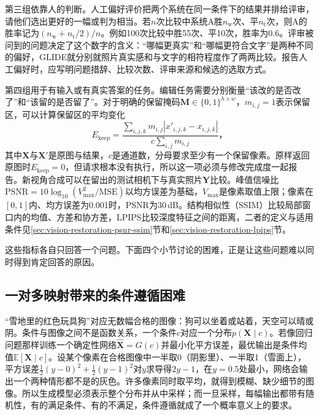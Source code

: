 第三组依靠人的判断。人工偏好评价把两个系统在同一条件下的结果并排给评审，请他们选出更好的一幅或判为相当。若$n$次比较中系统A胜$n_{\mathrm{w}}$次、平$n_{\mathrm{t}}$次，则A的胜率记为$(n_{\mathrm{w}}+n_{\mathrm{t}}/2)/n$。例如100次比较中胜55次、平10次，胜率为0.6。评审被问到的问题决定了这个数字的含义：“哪幅更真实”和“哪幅更符合文字”是两种不同的偏好，GLIDE就分别就照片真实感和与文字的相符程度作了两两比较。报告人工偏好时，应写明问题措辞、比较次数、评审来源和候选的选取方式。

第四组用于有输入或有真实答案的任务。编辑任务需要分别衡量“该改的是否改了”和“该留的是否留了”。对于明确的保留掩码$\bm{M}\in\{0,1\}^{h\times w}$，$m_{i,j}=1$表示保留区，可以计算保留区的平均变化
\begin{equation}
 E_{\mathrm{keep}}=
 \frac{\sum_{i,j,k}m_{i,j}
       |x'_{i,j,k}-x_{i,j,k}|}
 {c\sum_{i,j}m_{i,j}}\text{，}
 \label{eq:vision-edit-preservation}
\end{equation}
其中$\bm{X}$与$\bm{X}'$是原图与结果，$c$是通道数，分母要求至少有一个保留像素。原样返回原图时$E_{\mathrm{keep}}=0$，但请求根本没有执行，所以这一项必须与修改完成度一起报告。新视角合成可以在留出的测试相机下与真实照片$\bm{Y}$比较。峰值信噪比$\mathrm{PSNR}=10\log_{10}(V_{\max}^2/\mathrm{MSE})$以均方误差为基础，$V_{\max}$是像素取值上限；像素在$[0,1]$内、均方误差为0.001时，PSNR为30\,dB。结构相似性（SSIM）比较局部窗口内的均值、方差和协方差，LPIPS比较深度特征之间的距离，二者的定义与适用条件见\ref{sec:vision-restoration-psnr-ssim}节和\ref{sec:vision-restoration-lpips}节。

这些指标各自只回答一个问题。下面四个小节讨论的困难，正是让这些问题难以同时得到肯定回答的原因。

\subsection{一对多映射带来的条件遵循困难}
\label{sec:vision-generation-challenge-one-to-many}

“雪地里的红色玩具狗”对应无数幅合格的图像：狗可以坐着或站着，天空可以晴或阴。条件与图像之间不是函数关系，一个条件$c$对应一个分布$p(\bm{X}\mid c)$。若像回归问题那样训练一个确定性网络$\widehat{\bm{X}}=G(c)$并最小化平方误差，最优输出是条件均值$\mathbb{E}[\bm{X}\mid c]$。设某个像素在合格图像中一半取0（阴影里）、一半取1（雪面上），平方误差$\frac12(y-0)^2+\frac12(y-1)^2$对$y$求导得$2y-1$，在$y=0.5$处最小，网络会输出一个两种情形都不是的灰色。许多像素同时取平均，就得到模糊、缺少细节的图像。所以生成模型必须表示整个分布并从中采样；而一旦采样，每幅输出都带有随机性，有的满足条件、有的不满足，条件遵循就成了一个概率意义上的要求。

